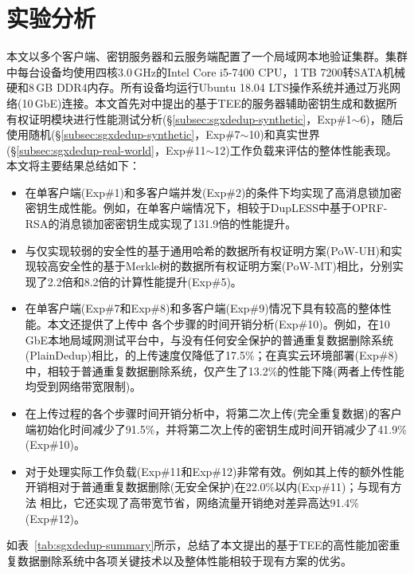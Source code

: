 \section{实验分析}
\label{sec:sgxdedup-evaluation}

本文以多个客户端、密钥服务器和云服务端配置了一个局域网本地验证集群。集群中每台设备均使用四核3.0\,GHz的Intel Core i5-7400 CPU，1\,TB 7200转SATA机械硬和8\,GB DDR4内存。所有设备均运行Ubuntu 18.04 LTS操作系统并通过万兆网络(10\,GbE)连接。本文首先对\sysnameS 中提出的基于TEE的服务器辅助密钥生成和数据所有权证明模块进行性能测试分析(\S\ref{subsec:sgxdedup-synthetic}，Exp\#1$\sim$6)，随后使用随机(\S\ref{subsec:sgxdedup-synthetic}，Exp\#7$\sim$10)和真实世界(\S\ref{subsec:sgxdedup-real-world}，Exp\#11$\sim$12)工作负载来评估\sysnameS 的整体性能表现。本文将主要结果总结如下：

\begin{itemize}[leftmargin=0em]
    \item \sysnameS 在单客户端(Exp\#1)和多客户端并发(Exp\#2)的条件下均实现了高消息锁加密密钥生成性能。例如，在单客户端情况下，相较于DupLESS\cite{bellare2013DupLESS}中基于OPRF-RSA的消息锁加密密钥生成实现了131.9倍的性能提升。
    \item \sysnameS 与仅实现较弱的安全性的基于通用哈希的数据所有权证明方案(PoW-UH)\cite{xu2013weak}和实现较高安全性的基于Merkle树的数据所有权证明方案(PoW-MT)\cite{halevi11}相比，分别实现了2.2倍和8.2倍的计算性能提升(Exp\#5)。
    \item \sysnameS 在单客户端(Exp\#7和Exp\#8)和多客户端(Exp\#9)情况下具有较高的整体性能。本文还提供了上传中 \sysnameS 各个步骤的时间开销分析(Exp\#10)。例如，在10\,GbE本地局域网测试平台中，与没有任何安全保护的普通重复数据删除系统(PlainDedup)相比，\sysnameS 的上传速度仅降低了17.5\%；在真实云环境部署(Exp\#8)中，相较于普通重复数据删除系统，\sysnameS 仅产生了13.2\%的性能下降(两者上传性能均受到网络带宽限制)。
    \item 在上传过程的各个步骤时间开销分析中，\sysnameS 将第二次上传(完全重复数据)的客户端初始化时间减少了91.5\%，并将第二次上传的密钥生成时间开销减少了41.9\%(Exp\#10)。
    \item \sysnameS 对于处理实际工作负载(Exp\#11和Exp\#12)非常有效。例如其上传的额外性能开销相对于普通重复数据删除(无安全保护)在22.0\%以内(Exp\#11)；与现有方法\cite{li15,harnik2010side} 相比，它还实现了高带宽节省，网络流量开销绝对差异高达91.4\%(Exp\#12)。
\end{itemize}

如表~\ref{tab:sgxdedup-summary}所示，总结了本文提出的基于TEE的高性能加密重复数据删除系统\sysnameS 中各项关键技术以及整体性能相较于现有方案的优劣。

